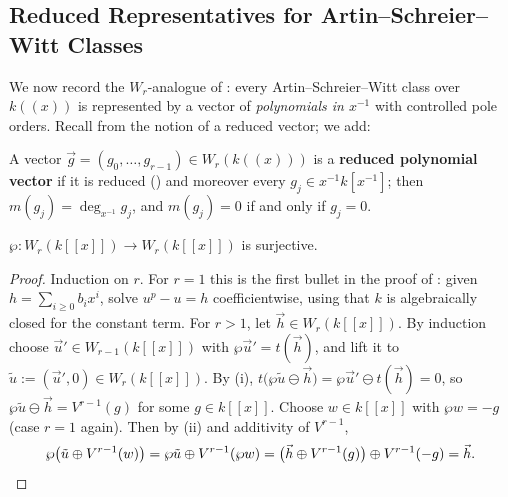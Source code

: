 

\subsection{Reduced Representatives for Artin--Schreier--Witt Classes}\label{subsection:asw_reduced_representatives}

We now record the $W_r$-analogue of
: every Artin--Schreier--Witt class
over $k((x))$ is represented by a vector of \emph{polynomials in $x^{-1}$}
with controlled pole orders. Recall from
 the notion of a reduced vector; we add:

\begin{definition}\label{definition:reduced_polynomial_vector}
    A vector $\vec g = (g_0, \dots, g_{r-1}) \in W_r(k((x)))$ is a \textbf{reduced
    polynomial vector} if it is reduced () and
    moreover every $g_j \in x^{-1}k[x^{-1}]$; then $m(g_j) = \deg_{x^{-1}} g_j$, and
    $m(g_j) = 0$ if and only if $g_j = 0$.
\end{definition}

\begin{lemma}\label{lemma:wp_surjective_on_integral_witt}
    $\wp \colon W_r(k[[x]]) \to W_r(k[[x]])$ is surjective.
\end{lemma}

\begin{proof}
    Induction on $r$. For $r=1$ this is the first bullet in the proof of
    : given $h = \sum_{i \geq 0} b_i x^i$, solve
    $u^p - u = h$ coefficientwise, using that $k$ is algebraically closed for the
    constant term. For $r>1$, let $\vec h \in W_r(k[[x]])$. By induction choose
    $\vec u' \in W_{r-1}(k[[x]])$ with $\wp \vec u' = t(\vec h)$, and lift it to
    $\tilde u := (\vec u', 0) \in W_r(k[[x]])$. By
    (i),
    $t\bigl(\wp \tilde u \ominus \vec h\bigr) = \wp \vec u' \ominus t(\vec h) = 0$, so
    $\wp \tilde u \ominus \vec h = V^{r-1}(g)$ for some $g \in k[[x]]$. Choose
    $w \in k[[x]]$ with $\wp w = -g$ (case $r=1$ again). Then by
    (ii) and additivity of $V^{r-1}$,
    \[
    \wp\bigl(\tilde u \oplus V^{r-1}(w)\bigr)
    = \wp \tilde u \oplus V^{r-1}(\wp w)
    = \bigl(\vec h \oplus V^{r-1}(g)\bigr) \oplus V^{r-1}(-g) = \vec h. \qedhere
    \]
\end{proof}

